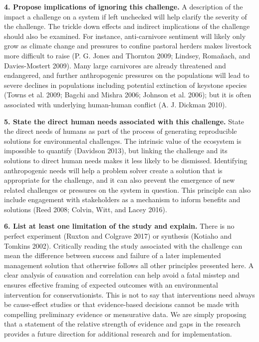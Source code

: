 \documentclass[fleqn,10pt]{wlpeerj} %
\begin{document}
\textbf{4. Propose implications of ignoring this challenge.} A
description of the impact a challenge on a system if left unchecked will
help clarify the severity of the challenge. The trickle down effects and
indirect implications of the challenge should also be examined. For
instance, anti-carnivore sentiment will likely only grow as climate
change and pressures to confine pastoral herders makes livestock more
difficult to raise (P. G. Jones and Thornton 2009; Lindsey, Romañach,
and Davies-Mostert 2009). Many large carnivores are already threatened
and endangered, and further anthropogenic pressures on the populations
will lead to severe declines in populations including potential
extinction of keystone species (Towns et al. 2009; Bagchi and Mishra
2006; Johnson et al. 2006); but it is often associated with underlying
human-human conflict (A. J. Dickman 2010).

\textbf{5. State the direct human needs associated with this challenge.}
State the direct needs of humans as part of the process of generating
reproducible solutions for environmental challenges. The intrinsic value
of the ecosystem is impossible to quantify (Davidson 2013), but linking
the challenge and its solutions to direct human needs makes it less
likely to be dismissed. Identifying anthropogenic needs will help a
problem solver create a solution that is appropriate for the challenge,
and it can also prevent the emergence of new related challenges or
pressures on the system in question. This principle can also include
engagement with stakeholders as a mechanism to inform benefits and
solutions (Reed 2008; Colvin, Witt, and Lacey 2016).

\textbf{6. List at least one limitation of the study and explain.} There
is no perfect experiment (Ruxton and Colgrave 2017) or synthesis
(Kotiaho and Tomkins 2002). Critically reading the study associated with
the challenge can mean the difference between success and failure of a
later implemented management solution that otherwise follows all other
principles presented here. A clear analysis of causation and correlation
can help avoid a fatal misstep and ensures effective framing of expected
outcomes with an environmental intervention for conservationists. This
is not to say that interventions need always be cause-effect studies or
that evidence-based decisions cannot be made with compelling preliminary
evidence or mensurative data. We are simply proposing that a statement
of the relative strength of evidence and gaps in the research provides a
future direction for additional research and for implementation.
\end{document}
